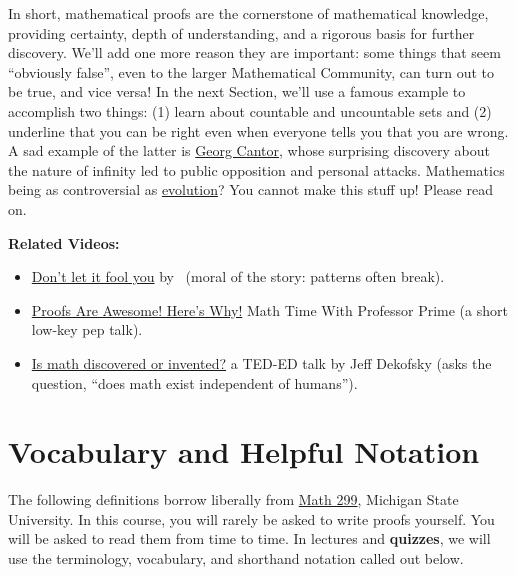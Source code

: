 \begin{tcolorbox}[title = {Mathematical Proofs Promote Understanding}, sharp corners, colback=lightgold, colframe=black, coltitle=white, breakable, fonttitle=\bfseries]
In short, mathematical proofs are the cornerstone of mathematical knowledge, providing certainty, depth of understanding, and a rigorous basis for further discovery. We'll add one more reason they are important: some things that seem ``obviously false'', even to the larger Mathematical Community, can turn out to be true, and vice versa! In the next Section, we'll use a famous example to accomplish two things: (1) learn about countable and uncountable sets and (2) underline that you can be right even when everyone tells you that you are wrong. A sad example of the latter is  \href{https://en.wikipedia.org/wiki/Georg_Cantor}{Georg Cantor}, whose surprising discovery about the nature of infinity led to public opposition and personal attacks. Mathematics being as controversial as \href{https://en.wikipedia.org/wiki/Scopes_trial}{evolution}? You cannot make this stuff up! Please read on.
\end{tcolorbox}

\textbf{Related Videos:}
\begin{itemize}
    \item \href{https://www.youtube.com/shorts/VFbyGEZLMZw?feature=share}{Don't let it fool you} by \threebb ~(moral of the story: patterns often break).
    \item \href{https://youtu.be/TvQt372BLT8}{Proofs Are Awesome! Here's Why!} 
Math Time With Professor Prime (a short low-key pep talk).
\item \href{https://youtu.be/X_xR5Kes4Rs}{Is math discovered or invented?} a TED-ED talk by Jeff Dekofsky (asks the question, ``does math exist independent of humans'').
\end{itemize}



\section{Vocabulary and Helpful Notation} 
The following definitions borrow liberally from \href{https://users.math.msu.edu/users/duncan42/AxiomNotes.pdf}{Math 299}, Michigan State University. In this course, you will rarely be asked to write proofs yourself. You will be asked to read them from time to time. In lectures and \textbf{quizzes}, we will use the terminology, vocabulary, and shorthand notation called out below.


